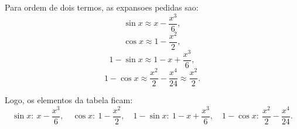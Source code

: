 Para ordem de dois termos, as expansoes pedidas sao:
\[
\sin x \approx x - \frac{x^3}{6},
\]
\[
\cos x \approx 1 - \frac{x^2}{2},
\]
\[
1-\sin x \approx 1 - x + \frac{x^3}{6},
\]
\[
1-\cos x \approx \frac{x^2}{2} - \frac{x^4}{24}
\approx \frac{x^2}{2}.
\]

Logo, os elementos da tabela ficam:
\[
\sin x:~x-\frac{x^3}{6},\quad
\cos x:~1-\frac{x^2}{2},\quad
1-\sin x:~1-x+\frac{x^3}{6},\quad
1-\cos x:~\frac{x^2}{2}-\frac{x^4}{24}.
\]